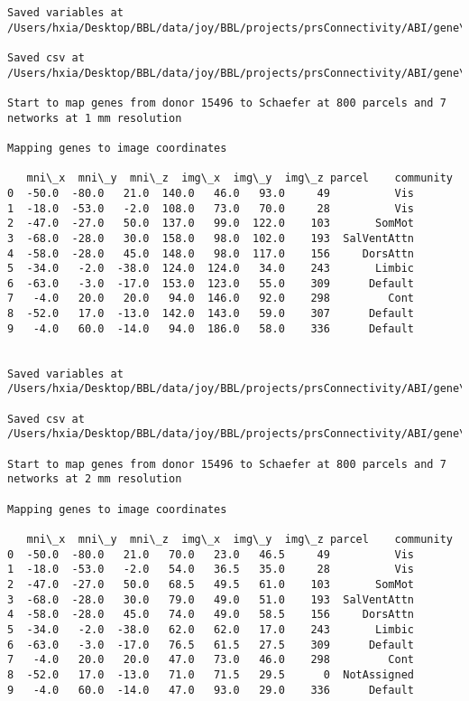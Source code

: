 \documentclass[11pt]{article}
\begin{document}
\begin{Verbatim}[commandchars=\\\{\}]
Saved variables at /Users/hxia/Desktop/BBL/data/joy/BBL/projects/prsConnectivity/ABI/gene\_mapping/15496donor\_600Parcels\_17Network\_2mm.pkl

Saved csv at /Users/hxia/Desktop/BBL/data/joy/BBL/projects/prsConnectivity/ABI/gene\_mapping/15496donor\_600Parcels\_17Network\_2mm.csv

Start to map genes from donor 15496 to Schaefer at 800 parcels and 7 networks at 1 mm resolution

Mapping genes to image coordinates

   mni\_x  mni\_y  mni\_z  img\_x  img\_y  img\_z parcel    community
0  -50.0  -80.0   21.0  140.0   46.0   93.0     49          Vis
1  -18.0  -53.0   -2.0  108.0   73.0   70.0     28          Vis
2  -47.0  -27.0   50.0  137.0   99.0  122.0    103       SomMot
3  -68.0  -28.0   30.0  158.0   98.0  102.0    193  SalVentAttn
4  -58.0  -28.0   45.0  148.0   98.0  117.0    156     DorsAttn
5  -34.0   -2.0  -38.0  124.0  124.0   34.0    243       Limbic
6  -63.0   -3.0  -17.0  153.0  123.0   55.0    309      Default
7   -4.0   20.0   20.0   94.0  146.0   92.0    298         Cont
8  -52.0   17.0  -13.0  142.0  143.0   59.0    307      Default
9   -4.0   60.0  -14.0   94.0  186.0   58.0    336      Default


Saved variables at /Users/hxia/Desktop/BBL/data/joy/BBL/projects/prsConnectivity/ABI/gene\_mapping/15496donor\_800Parcels\_7Network\_1mm.pkl

Saved csv at /Users/hxia/Desktop/BBL/data/joy/BBL/projects/prsConnectivity/ABI/gene\_mapping/15496donor\_800Parcels\_7Network\_1mm.csv

Start to map genes from donor 15496 to Schaefer at 800 parcels and 7 networks at 2 mm resolution

Mapping genes to image coordinates

   mni\_x  mni\_y  mni\_z  img\_x  img\_y  img\_z parcel    community
0  -50.0  -80.0   21.0   70.0   23.0   46.5     49          Vis
1  -18.0  -53.0   -2.0   54.0   36.5   35.0     28          Vis
2  -47.0  -27.0   50.0   68.5   49.5   61.0    103       SomMot
3  -68.0  -28.0   30.0   79.0   49.0   51.0    193  SalVentAttn
4  -58.0  -28.0   45.0   74.0   49.0   58.5    156     DorsAttn
5  -34.0   -2.0  -38.0   62.0   62.0   17.0    243       Limbic
6  -63.0   -3.0  -17.0   76.5   61.5   27.5    309      Default
7   -4.0   20.0   20.0   47.0   73.0   46.0    298         Cont
8  -52.0   17.0  -13.0   71.0   71.5   29.5      0  NotAssigned
9   -4.0   60.0  -14.0   47.0   93.0   29.0    336      Default



\end{Verbatim}
\end{document}
